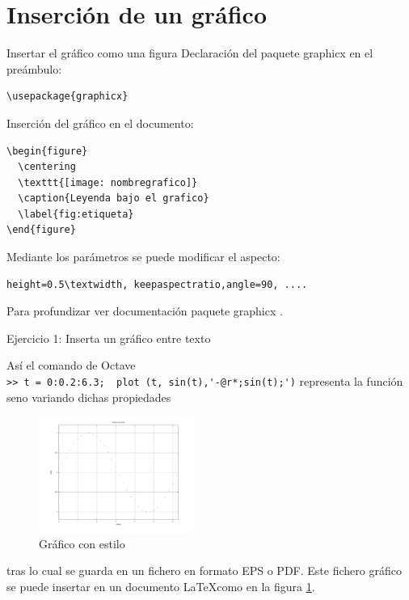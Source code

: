 \documentclass{beamer}
\begin{document}
\section{Inserci\'on de un gr\'afico}
\begin{frame}[fragile]{Insertar el gr\'afico como una figura}
Declaraci\'on del paquete graphicx en el pre\'ambulo:
\begin{verbatim}\usepackage{graphicx} \end{verbatim}

Inserci\'on del gr\'afico en el documento:
\begin{verbatim}
\begin{figure}
  \centering
  \texttt{[image: nombregrafico]}
  \caption{Leyenda bajo el grafico}
  \label{fig:etiqueta}
\end{figure}
\end{verbatim}
Mediante los par\'ametros se puede modificar el aspecto:\\
\begin{verbatim}height=0.5\textwidth, keepaspectratio,angle=90, ....\end{verbatim}
Para profundizar ver documentaci\'on paquete graphicx \cite{DocGraphicx} .
\end{frame}
\begin{frame}[fragile]
\begin{exampleblock}{Ejercicio 1: Inserta un gr\'afico entre texto}
{\small As\'i el comando de Octave\\
\verb|>> t = 0:0.2:6.3;  plot (t, sin(t),'-@r*;sin(t);')|
representa la funci\'on seno variando dichas propiedades
\begin{figure}
\begin{center}
\includegraphics[width=0.45\textwidth]{graficos/sin.pdf}
\end{center}
\caption{Gr\'afico con estilo \label{figura:sinestilo}}
\end{figure}
tras lo cual se guarda en un fichero  en formato EPS o PDF.
Este fichero gr\'afico se puede insertar en un documento \LaTeX como en la figura \ref{figura:sinestilo}.
}
\end{exampleblock}
\end{frame}
\end{document}
